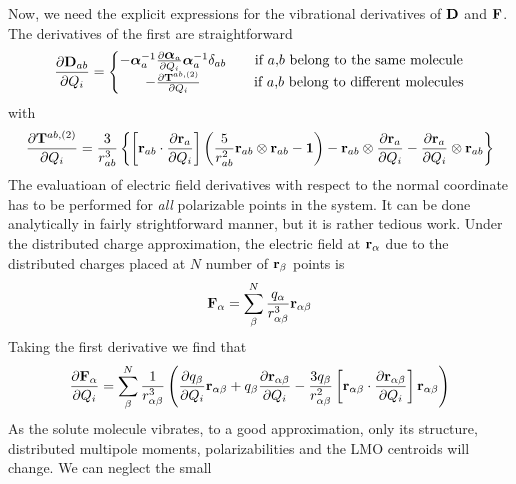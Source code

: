 \documentclass[a4paper,titlepage,twoside,fleqn,12pt]{book}
\newcommand{\BM}[1]{\ensuremath{\mbox{\boldmath${#1}$}}}
\newcommand{\fderiv}[2]{\ensuremath{
\frac{\partial #1}{\partial #2}}}
\begin{document}
\begin{refsection}
Now, we need the explicit expressions for the vibrational
derivatives of $\bf D$ and $\bf F$. The derivatives of the first are straightforward
%
\begin{equation}
\fderiv{{\bf D}_{ab}}{Q_i} = 
\left\{\begin{matrix}               
-{\BM \alpha}_a^{-1} \fderiv{{\BM \alpha}_a}{Q_i} {\BM \alpha}_a^{-1} 
                       \delta_{ab} && \text{if $a$,$b$ belong to the same molecule} \\
-\fderiv{{\bf T}^{ab,(2)}}{Q_i}  && \text{if $a$,$b$ belong to different molecules}
\end{matrix}\right. 
\end{equation}
%
with
%
\begin{equation}
\fderiv{{\bf T}^{ab,(2)}}{Q_i} = \frac{3}{r_{ab}^3} 
       \left\{ 
           \left[ 
                {\bf r}_{ab} \cdot \fderiv{{\bf r}_{a}}{Q_i} 
           \right]
           \left(
                 \frac{5}{r_{ab}^2} {\bf r}_{ab} \otimes {\bf r}_{ab} - {\bf 1}
           \right) -
                 {\bf r}_{ab} \otimes \fderiv{{\bf r}_{a}}{Q_i} - \fderiv{{\bf r}_{a}}{Q_i} \otimes {\bf r}_{ab}
       \right\}
\end{equation}
%
The evaluatioan of electric field derivatives with respect to the normal coordinate 
has to be performed for \emph{all} polarizable points in the system. 
It can be done analytically
in fairly strightforward manner, but it is rather tedious work. 
Under the distributed charge approximation, 
the electric field at ${\bf r}_\alpha$ due to the 
distributed charges placed at $N$ number of ${\bf r}_\beta$ points is
%
\begin{equation}
{\bf F}_\alpha = \sum_\beta^N \frac{q_\alpha}{r_{\alpha\beta}^3} {\bf r}_{\alpha\beta}
\end{equation}
%
Taking the first derivative we find that
%
\begin{equation}
\fderiv{{\bf F}_\alpha}{Q_i} = \sum_\beta^N \frac{1}{r_{\alpha\beta}^3}  
        \left(
            \fderiv{q_\beta}{Q_i}{\bf r}_{\alpha\beta} + q_\beta \fderiv{{\bf r}_{\alpha\beta}}{Q_i} - \frac{3q_\beta}{r_{\alpha\beta}^2} 
                \left[ 
                     {\bf r}_{\alpha\beta} \cdot \fderiv{{\bf r}_{\alpha\beta}}{Q_i} 
                \right] {\bf r}_{\alpha\beta}
        \right)
\end{equation}
%
As the solute molecule vibrates, to a good approximation, 
only its structure, distributed multipole moments, polarizabilities 
and the LMO centroids will change. We can neglect the small 

\end{refsection}
\end{document}
